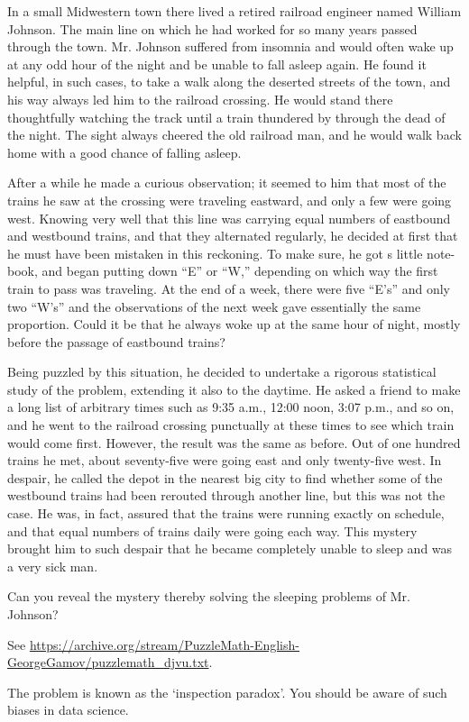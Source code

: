 \begin{exercise}
In a small Midwestern town there lived a retired railroad engineer named William
Johnson. The main line on which he had worked for so many years passed through the
town. Mr. Johnson suffered from insomnia and would often wake up at any odd hour of
the night and be unable to fall asleep again. He found it helpful, in such cases, to take a
walk along the deserted streets of the town, and his way always led him to the railroad
crossing. He would stand there thoughtfully watching the track until a train thundered by
through the dead of the night. The sight always cheered the old railroad man, and he
would walk back home with a good chance of falling asleep.

After a while he made a curious observation; it seemed to him that most of the trains he saw at the crossing were traveling eastward, and only a few were going west.
Knowing very well that this line was carrying equal numbers of eastbound and westbound trains, and that they alternated regularly, he decided at first that he must have been mistaken in this reckoning.
To make sure, he got s little note-book, and began putting down “E” or “W,” depending on which way the first train to pass was traveling.
At the end of a week, there were five “E’s” and only two “W’s” and the observations of the next week gave essentially the same proportion.
Could it be that he always woke up at the same hour of night, mostly before the passage of eastbound trains?

Being puzzled by this situation, he decided to undertake a rigorous statistical study of the problem, extending it also to the daytime.
He asked a friend to make a long list of arbitrary times such as 9:35 a.m., 12:00 noon, 3:07 p.m., and so on, and he went to the railroad crossing punctually at these times to see which train would come first.
However, the result was the same as before.
Out of one hundred trains he met, about seventy-five were going east and only twenty-five west.
In despair, he called the depot in the nearest big city to find whether some of the westbound trains had been rerouted through another line, but this was not the case.
He was, in fact, assured that the trains were running exactly on schedule, and that equal numbers of trains daily were going each way.
This mystery brought him to such despair that he became completely unable to sleep and was a very sick man.

Can you reveal the mystery thereby solving the sleeping problems of Mr. Johnson?
\begin{hint}
See \url{https://archive.org/stream/PuzzleMath-English-GeorgeGamov/puzzlemath_djvu.txt}.
\end{hint}
\begin{solution}
The problem is known as the `inspection paradox'. You should be aware of such biases in data science.
\end{solution}
\end{exercise}






